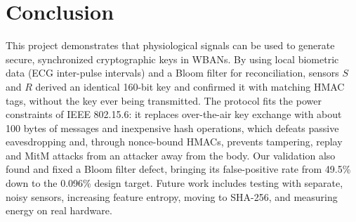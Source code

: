 \section{Conclusion}
This project demonstrates that physiological signals can be used to generate secure, synchronized cryptographic keys in WBANs. By using local biometric data (ECG inter-pulse intervals) and a Bloom filter for reconciliation, sensors $S$ and $R$ derived an identical 160-bit key and confirmed it with matching HMAC tags, without the key ever being transmitted. The protocol fits the power constraints of IEEE 802.15.6: it replaces over-the-air key exchange with about 100 bytes of messages and inexpensive hash operations, which defeats passive eavesdropping and, through nonce-bound HMACs, prevents tampering, replay and MitM attacks from an attacker away from the body. Our validation also found and fixed a Bloom filter defect, bringing its false-positive rate from 49.5\% down to the 0.096\% design target. Future work includes testing with separate, noisy sensors, increasing feature entropy, moving to SHA-256, and measuring energy on real hardware.

